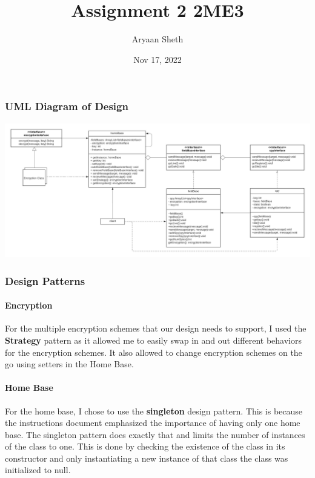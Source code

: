 \documentclass[12pt]{article}
\title{Assignment 2 2ME3}
\author{Aryaan Sheth}
\date{Nov 17, 2022}
\begin{document}
    \maketitle
    \newpage

    \part{}
    \section*{UML Diagram of Design}
        \includegraphics[scale=0.5]{part1_uml}

    \section*{Design Patterns}
        \subsection*{Encryption}
            For the multiple encryption schemes that our design needs to support, I used the \textbf{Strategy}
            pattern as it allowed me to easily swap in and out different behaviors for the encryption schemes.
            It also allowed to change encryption schemes on the go using setters in the Home Base. 

        \subsection*{Home Base}
            For the home base, I chose to use the \textbf{singleton} design pattern. This is because
            the instructions document emphasized the importance of having only one home base. The singleton
            pattern does exactly that and limits the number of instances of the class to one. 
            This is done by checking the existence of the class in its constructor and only instantiating a new
            instance of that class the class was initialized to null. 
        
\end{document}
